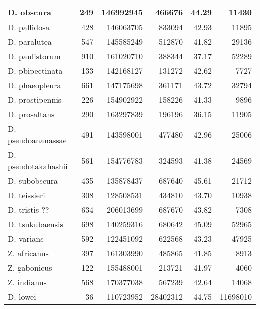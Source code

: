 \begin{table}
\begin{tabular}[t]{l|r|r|r|r|r}
\hline
D. obscura & 249 & 146992945 & 466676 & 44.29 & 11430\\
\hline
D. pallidosa & 428 & 146063705 & 833094 & 42.93 & 11895\\
\hline
D. paralutea & 547 & 145585249 & 512870 & 41.82 & 29136\\
\hline
D. paulistorum & 910 & 161020710 & 388344 & 37.17 & 52289\\
\hline
D. pbipectinata & 133 & 142168127 & 131272 & 42.62 & 7727\\
\hline
D. phaeopleura & 661 & 147175698 & 361171 & 43.72 & 32794\\
\hline
D. prostipennis & 226 & 154902922 & 158226 & 41.33 & 9896\\
\hline
D. prosaltans & 290 & 163297839 & 196196 & 36.15 & 11905\\
\hline
D. pseudoananassae & 491 & 143598001 & 477480 & 42.96 & 25006\\
\hline
D. pseudotakahashii & 561 & 154776783 & 324593 & 41.38 & 24569\\
\hline
D. subobscura & 435 & 135878437 & 687640 & 45.61 & 21712\\
\hline
D. teissieri & 308 & 128508531 & 434810 & 43.70 & 10938\\
\hline
D. tristis ?? & 634 & 206013699 & 687670 & 43.82 & 7308\\
\hline
D. tsukubaensis & 698 & 140259316 & 680642 & 45.09 & 52965\\
\hline
D. varians & 592 & 122451092 & 622568 & 43.23 & 47925\\
\hline
Z. africanus & 397 & 161303990 & 485865 & 41.85 & 8913\\
\hline
Z. gabonicus & 122 & 155488001 & 213721 & 41.97 & 4060\\
\hline
Z. indianus & 568 & 170377038 & 567239 & 42.64 & 14068\\
\hline
D. lowei & 36 & 110723952 & 28402312 & 44.75 & 11698010\\
\hline
\end{tabular}
\end{table}